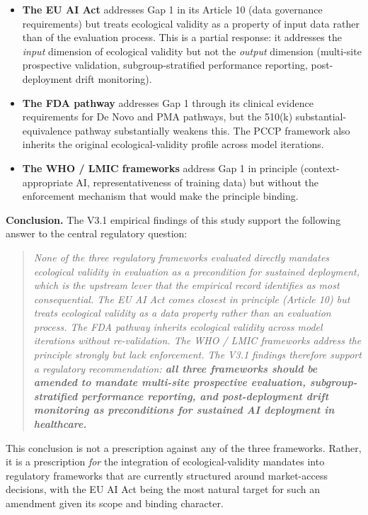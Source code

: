 \begin{itemize}
  \item \textbf{The EU AI Act} addresses Gap 1 in its
        Article 10 (data governance requirements) but
        treats ecological validity as a property of input
        data rather than of the evaluation process. This
        is a partial response: it addresses the
        \textit{input} dimension of ecological validity
        but not the \textit{output} dimension (multi-site
        prospective validation, subgroup-stratified
        performance reporting, post-deployment drift
        monitoring).
  \item \textbf{The FDA pathway} addresses Gap 1
        through its clinical evidence requirements for
        De Novo and PMA pathways, but the 510(k)
        substantial-equivalence pathway substantially
        weakens this. The PCCP framework also inherits
        the original ecological-validity profile across
        model iterations.
  \item \textbf{The WHO / LMIC frameworks} address
        Gap 1 in principle (context-appropriate AI,
        representativeness of training data) but
        without the enforcement mechanism that would
        make the principle binding.
\end{itemize}

\noindent\textbf{Conclusion.} The V3.1 empirical findings
of this study support the following answer to the central
regulatory question:

\begin{quote}
\textit{None of the three regulatory frameworks
evaluated directly mandates ecological validity in
evaluation as a precondition for sustained deployment,
which is the upstream lever that the empirical record
identifies as most consequential. The EU AI Act comes
closest in principle (Article 10) but treats ecological
validity as a data property rather than an evaluation
process. The FDA pathway inherits ecological validity
across model iterations without re-validation. The
WHO / LMIC frameworks address the principle strongly
but lack enforcement. The V3.1 findings therefore
support a regulatory recommendation: \textbf{all three
frameworks should be amended to mandate multi-site
prospective evaluation, subgroup-stratified performance
reporting, and post-deployment drift monitoring as
preconditions for sustained AI deployment in
healthcare.}}
\end{quote}

This conclusion is not a prescription against any of the
three frameworks. Rather, it is a prescription
\textit{for} the integration of ecological-validity
mandates into regulatory frameworks that are currently
structured around market-access decisions, with the EU
AI Act being the most natural target for such an
amendment given its scope and binding character.


